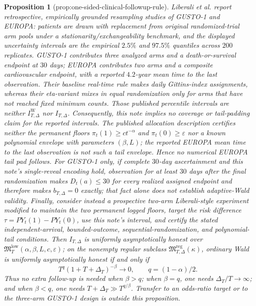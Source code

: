 \documentclass{article}
\newtheorem{proposition}{Proposition}
\begin{document}
\begin{proposition}[prop:one-sided-clinical-followup-rule]\label{prop:one-sided-clinical-followup-rule}
Liberali et al. \cite{LiberaliEtAl2025RTAR} report retrospective, empirically grounded resampling studies of GUSTO-1 and EUROPA: patients are drawn with replacement from original randomized-trial arm pools under a stationarity/exchangeability benchmark, and the displayed uncertainty intervals are the empirical \(2.5\%\) and \(97.5\%\) quantiles across \(200\) replicates.  GUSTO-1 contributes three analyzed arms and a death-or-survival endpoint at \(30\) days; EUROPA contributes two arms and a composite cardiovascular endpoint, with a reported \(4.2\)-year mean time to the last observation.  Their baseline real-time rule makes daily Gittins-index assignments, whereas their eta-variant mixes in equal randomization only for arms that have not reached fixed minimum counts.  Those published percentile intervals are neither \(I_{T,\Delta}^{\mathrm W}\) nor \(I_{T,\Delta}\).  Consequently, this note implies no coverage or tail-padding claim for the reported intervals.  The published allocation description certifies neither the permanent floors \(\pi_t(1)\geq ct^{-\alpha}\) and \(\pi_t(0)\geq\varepsilon\) nor a known polynomial envelope with parameters \((\beta,L)\); the reported EUROPA mean time to the last observation is not such a tail envelope.  Hence no numerical EUROPA tail pad follows.  For GUSTO-1 only, if complete \(30\)-day ascertainment and this note's single-reveal encoding hold, observation for at least \(30\) days after the final randomization makes \(D_t(a)\leq30\) for every realized assigned endpoint and therefore makes \(b_{T,\Delta}=0\) exactly; that fact alone does not establish adaptive-Wald validity.  Finally, consider instead a prospective two-arm Liberali-style experiment modified to maintain the two permanent logged floors, target the risk difference \(\tau=P Y_t(1)-P Y_t(0)\), use this note's interval, and certify the stated independent-arrival, bounded-outcome, sequential-randomization, and polynomial-tail conditions.  Then \(I_{T,\Delta}\) is uniformly asymptotically honest over \(\mathfrak M_T^{\mathrm{low}}(\alpha,\beta,L,c,\varepsilon)\); on the nonempty regular subclass \(\mathfrak M_{T,\Delta}^{\mathrm{reg}}(\kappa)\), ordinary Wald is uniformly asymptotically honest if and only if
\[
 T^q(1+T+\Delta_T)^{-\beta}\longrightarrow0,
 \qquad q=(1-\alpha)/2.
\]
Thus no extra follow-up is needed when \(\beta>q\); when \(\beta=q\), one needs \(\Delta_T/T\to\infty\); and when \(\beta<q\), one needs \(T+\Delta_T\gg T^{q/\beta}\).  Transfer to an odds-ratio target or to the three-arm GUSTO-1 design is outside this proposition.
\end{proposition}
\end{document}
